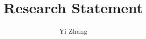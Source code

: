 \documentclass[10pt,a4paper]{article}
\begin{document}
\title{Research Statement}

\author{Yi Zhang}




\date{}
\maketitle
\end{document}
